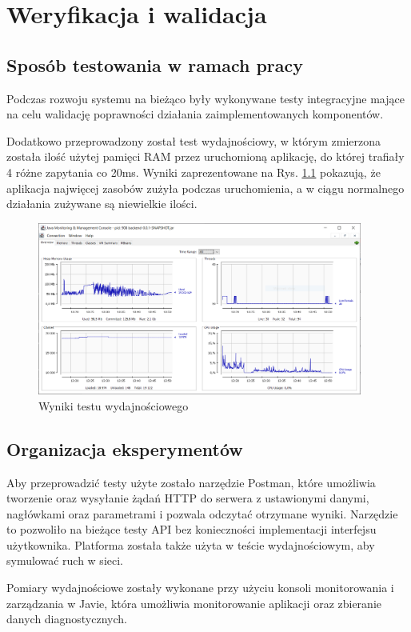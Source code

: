 \chapter{Weryfikacja i walidacja}
\label{ch:06}
\section{Sposób testowania w ramach pracy}
Podczas rozwoju systemu na bieżąco były wykonywane testy integracyjne mające na celu walidację poprawności działania zaimplementowanych komponentów. 

Dodatkowo przeprowadzony został test wydajnościowy, w którym zmierzona została ilość użytej pamięci RAM przez uruchomioną aplikację, do której trafiały 4 różne zapytania co 20ms. Wyniki zaprezentowane na Rys. \ref{fig:performance} pokazują, że aplikacja najwięcej zasobów zużyła podczas uruchomienia, a w ciągu normalnego działania zużywane są niewielkie ilości.
\begin{figure}[h]
\centering
\includegraphics[width=0.95\textwidth]{./graf/performance.PNG}
\caption{Wyniki testu wydajnościowego}
\label{fig:performance}
\end{figure}

\section{Organizacja eksperymentów}
Aby przeprowadzić testy użyte zostało narzędzie Postman, które umożliwia tworzenie oraz wysyłanie żądań HTTP do serwera z ustawionymi danymi, nagłówkami oraz parametrami i pozwala odczytać otrzymane wyniki. Narzędzie to pozwoliło na bieżące testy API bez konieczności implementacji interfejsu użytkownika. Platforma została także użyta w teście wydajnościowym, aby symulować ruch w sieci.

Pomiary wydajnościowe zostały wykonane przy użyciu konsoli monitorowania i zarządzania w Javie, która umożliwia monitorowanie aplikacji oraz zbieranie danych diagnostycznych. 

